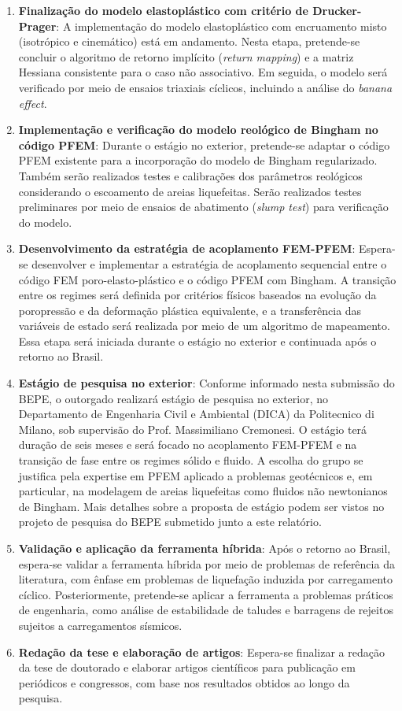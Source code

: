\begin{enumerate}
    \item \textbf{Finalização do modelo elastoplástico com critério de Drucker-Prager}: A implementação do modelo elastoplástico com encruamento misto (isotrópico e cinemático) está em andamento. Nesta etapa, pretende-se concluir o algoritmo de retorno implícito (\textit{return mapping}) e a matriz Hessiana consistente para o caso não associativo. Em seguida, o modelo será verificado por meio de ensaios triaxiais cíclicos, incluindo a análise do \textit{banana effect}.

    \item \textbf{Implementação e verificação do modelo reológico de Bingham no código PFEM}: Durante o estágio no exterior, pretende-se adaptar o código PFEM existente para a incorporação do modelo de Bingham regularizado. Também serão realizados testes e calibrações dos parâmetros reológicos considerando o escoamento de areias liquefeitas. Serão realizados testes preliminares por meio de ensaios de abatimento (\textit{slump test}) para verificação do modelo.
    
    \item \textbf{Desenvolvimento da estratégia de acoplamento FEM-PFEM}: Espera-se desenvolver e implementar a estratégia de acoplamento sequencial entre o código FEM poro-elasto-plástico e o código PFEM com Bingham. A transição entre os regimes será definida por critérios físicos baseados na evolução da poropressão e da deformação plástica equivalente, e a transferência das variáveis de estado será realizada por meio de um algoritmo de mapeamento. Essa etapa será iniciada durante o estágio no exterior e continuada após o retorno ao Brasil.
    
    \item \textbf{Estágio de pesquisa no exterior}: Conforme informado nesta submissão do BEPE, o outorgado realizará estágio de pesquisa no exterior, no Departamento de Engenharia Civil e Ambiental (DICA) da Politecnico di Milano, sob supervisão do Prof. Massimiliano Cremonesi. O estágio terá duração de seis meses e será focado no acoplamento FEM-PFEM e na transição de fase entre os regimes sólido e fluido. A escolha do grupo se justifica pela expertise em PFEM aplicado a problemas geotécnicos e, em particular, na modelagem de areias liquefeitas como fluidos não newtonianos de Bingham. Mais detalhes sobre a proposta de estágio podem ser vistos no projeto de pesquisa do BEPE submetido junto a este relatório.
    
    \item \textbf{Validação e aplicação da ferramenta híbrida}: Após o retorno ao Brasil, espera-se validar a ferramenta híbrida por meio de problemas de referência da literatura, com ênfase em problemas de liquefação induzida por carregamento cíclico. Posteriormente, pretende-se aplicar a ferramenta a problemas práticos de engenharia, como análise de estabilidade de taludes e barragens de rejeitos sujeitos a carregamentos sísmicos.
    
    \item \textbf{Redação da tese e elaboração de artigos}: Espera-se finalizar a redação da tese de doutorado e elaborar artigos científicos para publicação em periódicos e congressos, com base nos resultados obtidos ao longo da pesquisa.
\end{enumerate}